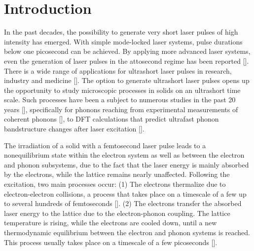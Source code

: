 \documentclass[ aps, prb, reprint, groupedaddress]{revtex4-1}
\makeatletter
\newcommand{\citen}[1]{\def\NAT@spacechar{}[\citenum{#1}]}
\makeatother
\begin{document}
\maketitle

\section{Introduction}
In the past decades, the possibility to generate very short laser pulses of high intensity has emerged. With simple mode-locked laser systems, pulse durations below one picosecond can be achieved. 
By applying more advanced
laser systems, even the generation of laser pulses in the attosecond regime has been reported \citen{Brabec00, Silberberg01}.
There is a wide range of applications for ultrashort laser pulses in research, industry and medicine \citen{Bauerle, Vogel03}.
The option to generate ultrashort laser pulses opens up the opportunity to study microscopic processes in solids on an ultrashort time scale. 
Such processes have been a subject to numerous studies in the past 20 years \citen{Sokolowski98, Cavalleri01, Zijlstra13PRX, Rethfeld02met, Wang94, Sun94, Kaiser00, DelFatti00, Pietanza07, Aoki14, Mueller13PRB}, 
specifically for phonons reaching from 
experimental measurements of coherent phonons \citen{Hase98, Sokolowski03, Harmand13},
to DFT calculations that predict ultrafast phonon bandstructure changes after laser excitation \citen{Klett15, Recoules06, Zijlstra13APA}.











The irradiation of a solid with a femtosecond laser pulse leads to a nonequilibrium state within the electron system as well as between the electron and phonon subsystems, 
due to the fact that the laser energy is mainly absorbed by the electrons, 
while the lattice remains nearly unaffected.
Following the excitation, two main processes occur: (1) The electrons thermalize due to electron-electron collisions, a process that takes place on a timescale of a few up
to several hundreds of femtoseconds \citen{Mueller12,Groeneveld92,DelFatti00, Mueller13PRB}. (2) The electrons
transfer the absorbed laser energy to the lattice due to the electron-phonon coupling. The lattice temperature is rising, while the electrons are cooled down, until a new thermodynamic equilibrium between the 
electron and phonon systems is reached. This process usually takes place on a timescale of a few picoseconds \citen{Groeneveld92}.
\end{document}
